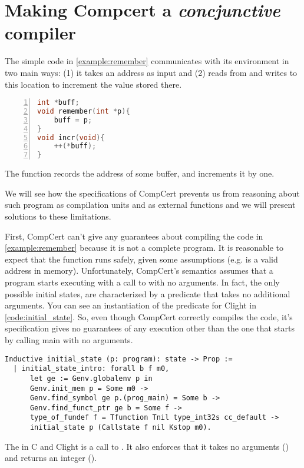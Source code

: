 \chapter{Making Compcert a \emph{concjunctive} compiler }\label{ch:compcert}

The simple code in \ref{example:remember} communicates with its environment in two main ways: (1) it takes an address as input and (2) reads from and writes to this location to increment the value stored there.
\begin{table}\begin{lstlisting}[language=C, numbers=left]
int *buff;
void remember(int *p){
    buff = p;
}
void incr(void){
    ++(*buff);
}
\end{lstlisting}
\caption{The function  records the address of some buffer, and  increments it by one. }
\label{example:remember}
\end{table}
We will see how the specifications of CompCert prevents us from reasoning about such program as compilation units and as external functions and we will present solutions to these limitations.

First, CompCert can't give any guarantees about compiling the code in \ref{example:remember} because it is not a complete program. It is reasonable to expect that the function  runs safely, given some assumptions (e.g.  is a valid address in memory). Unfortunately, CompCert's semantics assumes that a program starts executing with a call to   with no arguments. In fact, the only possible initial states, are characterized by a predicate  that takes no additional arguments. You can see an instantiation of the predicate for Clight in \ref{code:initial_state}. So, even though CompCert correctly compiles the code, it's specification gives no guarantees of any execution other than the one that starts by calling main with no arguments.
\begin{table}
\begin{lstlisting}
Inductive initial_state (p: program): state -> Prop :=
  | initial_state_intro: forall b f m0,
      let ge := Genv.globalenv p in
      Genv.init_mem p = Some m0 ->
      Genv.find_symbol ge p.(prog_main) = Some b ->
      Genv.find_funct_ptr ge b = Some f ->
      type_of_fundef f = Tfunction Tnil type_int32s cc_default ->
      initial_state p (Callstate f nil Kstop m0).
\end{lstlisting}
\caption{The  in C and Clight is a call to . It also enforces that it takes no arguments () and returns an integer ().}\label{code:initial_state}
\end{table}


